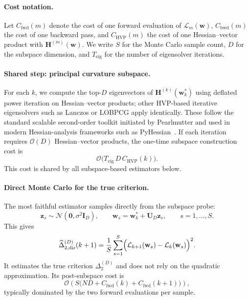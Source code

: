 \documentclass{article}
\begin{document}
\paragraph{Cost notation.}
Let $C_{\mathrm{fwd}}(m)$ denote the cost of one forward evaluation of $\mathcal L_m(\mathbf w)$, $C_{\mathrm{bwd}}(m)$ the cost of one backward pass, and $C_{\mathrm{HVP}}(m)$ the cost of one Hessian--vector product with $\mathbf H^{(m)}(\mathbf w)$.
We write $S$ for the Monte Carlo sample count, $D$ for the subspace dimension, and $T_{\mathrm{eig}}$ for the number of eigensolver iterations.

\paragraph{Shared step: principal curvature subspace.}
For each $k$, we compute the top-$D$ eigenvectors of $\mathbf H^{(k)}(\mathbf w_k^*)$ using deflated power iteration on Hessian--vector products; other HVP-based iterative eigensolvers such as Lanczos or LOBPCG apply identically. These follow the standard scalable second-order toolkit initiated by Pearlmutter and used in modern Hessian-analysis frameworks such as PyHessian~\citep{pearlmutter1994fast,yao2020pyhessian}. If each iteration requires $\mathcal O(D)$ Hessian--vector products, the one-time subspace construction cost is
\[
\mathcal O\!\bigl(T_{\mathrm{eig}}\,D\,C_{\mathrm{HVP}}(k)\bigr).
\]
This cost is shared by all subspace-based estimators below.

\paragraph{Direct Monte Carlo for the true criterion.}
The most faithful estimator samples directly from the subspace probe:
\[
\mathbf z_s \sim \mathcal N(\mathbf 0,\sigma^2\mathbf I_D),
\qquad
\mathbf w_s=\mathbf w_k^*+\mathbf U_D\mathbf z_s,
\qquad
s=1,\dots,S.
\]
This gives
\begin{equation}
\label{eq:direct-subspace-mc}
\widehat{\Delta}_{2,\mathrm{dir}}^{(D)}(k+1)
=
\frac{1}{S}\sum_{s=1}^S
\Bigl(
\mathcal L_{k+1}(\mathbf w_s)-\mathcal L_k(\mathbf w_s)
\Bigr)^2.
\end{equation}
It estimates the true criterion $\Delta_2^{(D)}$ and does not rely on the quadratic approximation. Its post-subspace cost is
\[
\mathcal O\!\left(
S\bigl(
ND + C_{\mathrm{fwd}}(k)+C_{\mathrm{fwd}}(k+1)
\bigr)
\right),
\]
typically dominated by the two forward evaluations per sample.
\end{document}
